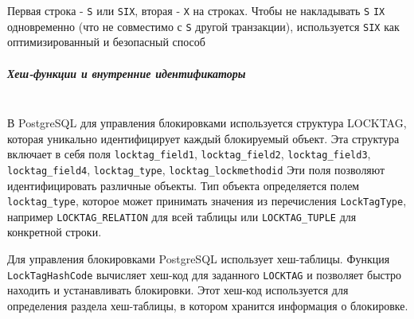  Первая строка - \texttt{S} или \texttt{SIX}, вторая - \texttt{X} на строках. 
 Чтобы не накладывать \texttt{S} \+ \texttt{IX} одновременно (что не совместимо с \texttt{S} другой транзакции), используется \texttt{SIX} как оптимизированный и безопасный способ

\subparagraph{Хеш-функции и внутренние идентификаторы} ~\\

 В PostgreSQL для управления блокировками используется структура LOCKTAG, которая уникально идентифицирует каждый блокируемый объект. Эта структура включает в себя поля \texttt{locktag\_field1}, \texttt{locktag\_field2}, \texttt{locktag\_field3}, \texttt{locktag\_field4}, \texttt{locktag\_type}, \texttt{locktag\_lockmethodid} \autocite{PostgreSQLlockh1, PostgreSQLlockh2}
 Эти поля позволяют идентифицировать различные объекты. Тип объекта определяется полем \texttt{locktag\_type}, которое может принимать значения из перечисления \texttt{LockTagType}, например \texttt{LOCKTAG\_RELATION} для всей таблицы или \texttt{LOCKTAG\_TUPLE} для конкретной строки.
 
 Для управления блокировками PostgreSQL использует хеш-таблицы. Функция \texttt{LockTagHashCode} вычисляет хеш-код для заданного \texttt{LOCKTAG} и позволяет быстро находить и устанавливать блокировки. Этот хеш-код используется для определения раздела хеш-таблицы, в котором хранится информация о блокировке. \autocite{PostgreSQLlockc1, PostgreSQLlockc2}

